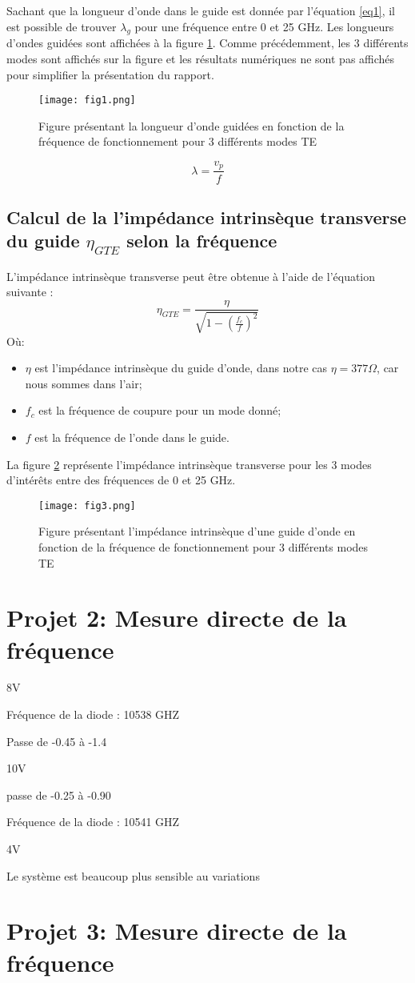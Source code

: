 Sachant que la longueur d'onde dans le guide est donnée par l'équation \ref{eq1}, il est possible de trouver $\lambda_g$ pour une fréquence entre 0 et 25 GHz. Les longueurs d'ondes guidées sont affichées à la figure \ref{fig2}. Comme précédemment, les 3 différents modes sont affichés sur la figure et les résultats numériques ne sont pas affichés pour simplifier la présentation du rapport.

\begin{figure}[htbp]
    \centering
    \texttt{[image: fig1.png]}
    \caption{Figure présentant la longueur d'onde guidées en fonction de la fréquence de fonctionnement pour 3 différents modes TE}
    \label{fig2}
\end{figure}

\begin{equation}
	\label{eq1}
	\lambda = \frac{v_p}{f}
\end{equation}

\subsection{Calcul de la l'impédance intrinsèque transverse du guide $\eta_{GTE}$ selon la fréquence}
L'impédance intrinsèque transverse peut être obtenue à l'aide de l'équation suivante :
\begin{equation}
	\eta_{GTE} = \frac{\eta}{\sqrt{1-\left(\frac{f_c}{f}\right)^2}}
\end{equation}
Où:
\begin{itemize}
	\item $\eta$ est l'impédance intrinsèque du guide d'onde, dans notre cas $\eta = 377\Omega$, car nous sommes dans l'air;
	\item $f_c$ est la fréquence de coupure pour un mode donné;
	\item $f$ est la fréquence de l'onde dans le guide.
\end{itemize}

La figure \ref{fig3} représente l'impédance intrinsèque transverse pour les 3 modes d'intérêts entre des fréquences de 0 et 25 GHz.

\begin{figure}[htbp]
    \centering
    \texttt{[image: fig3.png]}
    \caption{Figure présentant l'impédance intrinsèque d'une guide d'onde en fonction de la fréquence de fonctionnement pour 3 différents modes TE}
    \label{fig3}
\end{figure}


\section{Projet 2: Mesure directe de la fréquence}
8V

Fréquence de la diode : 10538 GHZ

Passe de -0.45 à -1.4

10V

passe de -0.25 à -0.90

Fréquence de la diode : 10541 GHZ

4V

Le système est beaucoup plus sensible au variations

\section{Projet 3: Mesure directe de la fréquence}